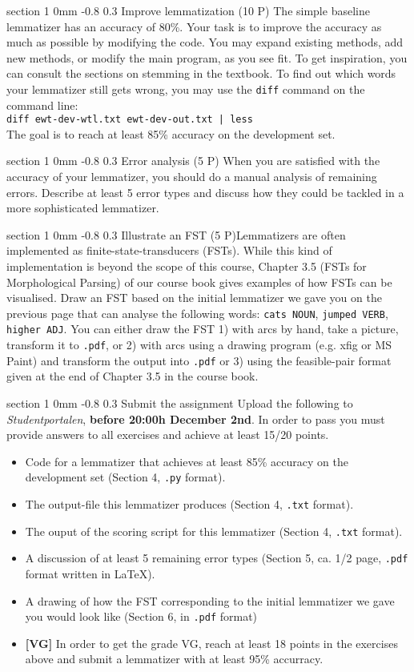 \documentclass[11pt]{article}
\makeatletter
\newcommand{\newsec}[2]{\section{#1}\label{sec:#2}\noindent}
\renewcommand{\section}{\@startsection
{section}%
{1}%
{0mm}%
{-0.8\baselineskip}%
{0.3\baselineskip}%
{\bfseries\large}}%
\makeatother
\begin{document}
\newsec{Improve lemmatization (10 P)}{improve}%
The simple baseline lemmatizer has an accuracy of 80\%. Your task is
to improve the accuracy as much as possible by modifying the code. You
may expand existing methods,
add new methods, or modify the main program, as you see fit. To get inspiration, you can consult the sections on stemming in the textbook. To find out which words your lemmatizer still gets wrong, you may use the \texttt{diff} command on the command line:\\

\noindent
\texttt{diff ewt-dev-wtl.txt ewt-dev-out.txt | less}\\

\noindent
The goal is to reach at least 85\% accuracy on the development set.

\newsec{Error analysis (5 P)}{error}%
When you are satisfied with the accuracy of your lemmatizer, you
should do a manual analysis of remaining errors. Describe at least 5
error types and discuss how they could be tackled in a more
sophisticated lemmatizer.

\newsec{Illustrate an FST (5 P)} %
LLemmatizers are often implemented as finite-state-transducers
(FSTs). While this kind of implementation is beyond the scope of this
course, Chapter 3.5 (FSTs for Morphological Parsing) of our course
book gives examples of how FSTs can be visualised. Draw an FST based
on the initial lemmatizer we gave you on the previous page that can
analyse the following words: \texttt{cats NOUN}, \texttt{jumped VERB},
\texttt{higher ADJ}. You can either draw the FST 1) with arcs by hand,
take a picture, transform it to \texttt{.pdf}, or 2) with arcs using a
drawing program (e.g. xfig or MS Paint) and transform the output into
\texttt{.pdf} or 3) using the feasible-pair format given at the end of
Chapter 3.5 in the course book.

\newsec{Submit the assignment}{submit}%
Upload the following to {\it Studentportalen}, \textbf{before 20:00h
  December 2nd}. In order to pass you must provide answers to all
exercises and achieve at least 15/20 points.
\begin{itemize}[noitemsep,topsep=0.2cm]
\item Code for a lemmatizer that achieves at least 85\% accuracy on
  the development set (Section 4, \texttt{.py} format).
\item The output-file this lemmatizer produces (Section 4,
  \texttt{.txt} format).
\item The ouput of the scoring script for this lemmatizer (Section 4,
  \texttt{.txt} format).
\item A discussion of at least 5 remaining error types (Section 5, ca. 1/2 page,
  \texttt{.pdf} format written in \LaTeX).
\item A drawing of how the FST corresponding to the initial
  lemmatizer we gave you would look like (Section 6, in \texttt{.pdf} format)
\item \textbf{[VG]} In order to get the grade VG, reach at least 18
  points in the exercises above and submit a lemmatizer with at least
  95\% accurracy. 
\end{itemize}
\end{document}
